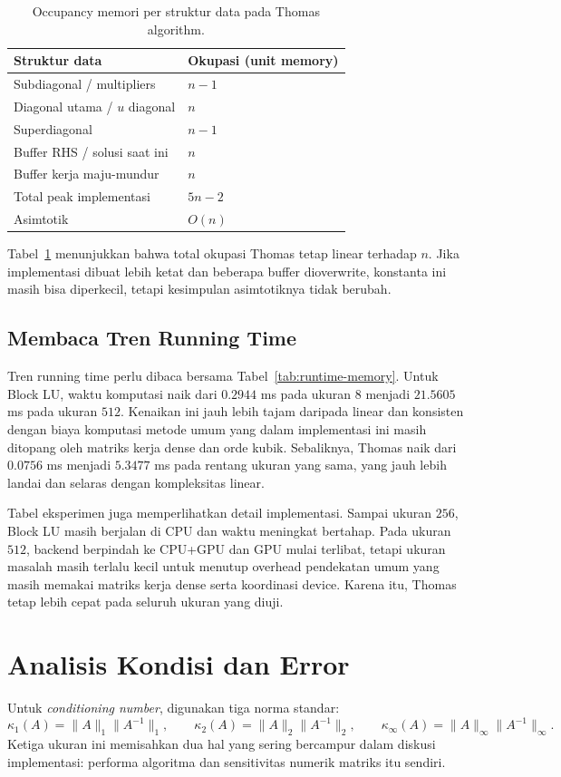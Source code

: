 \documentclass[12pt,a4paper]{article}
\begin{document}
\begin{table}[h]
\centering
\caption{Occupancy memori per struktur data pada Thomas algorithm.}
\label{tab:thomas-memory}
\begin{tabular}{ll}
\toprule
Struktur data & Okupasi (unit memory) \\
\midrule
Subdiagonal / multipliers & $n-1$ \\
Diagonal utama / $u$ diagonal & $n$ \\
Superdiagonal & $n-1$ \\
Buffer RHS / solusi saat ini & $n$ \\
Buffer kerja maju-mundur & $n$ \\
\midrule
Total peak implementasi & $5n - 2$ \\
Asimtotik & $O(n)$ \\
\bottomrule
\end{tabular}
\end{table}

Tabel~\ref{tab:thomas-memory} menunjukkan bahwa total okupasi Thomas tetap linear terhadap $n$. Jika implementasi dibuat lebih ketat dan beberapa buffer dioverwrite, konstanta ini masih bisa diperkecil, tetapi kesimpulan asimtotiknya tidak berubah.

\subsection{Membaca Tren Running Time}
Tren running time perlu dibaca bersama Tabel~\ref{tab:runtime-memory}. Untuk Block LU, waktu komputasi naik dari $0.2944$ ms pada ukuran $8$ menjadi $21.5605$ ms pada ukuran $512$. Kenaikan ini jauh lebih tajam daripada linear dan konsisten dengan biaya komputasi metode umum yang dalam implementasi ini masih ditopang oleh matriks kerja dense dan orde kubik. Sebaliknya, Thomas naik dari $0.0756$ ms menjadi $5.3477$ ms pada rentang ukuran yang sama, yang jauh lebih landai dan selaras dengan kompleksitas linear.

Tabel eksperimen juga memperlihatkan detail implementasi. Sampai ukuran $256$, Block LU masih berjalan di CPU dan waktu meningkat bertahap. Pada ukuran $512$, backend berpindah ke CPU+GPU dan GPU mulai terlibat, tetapi ukuran masalah masih terlalu kecil untuk menutup overhead pendekatan umum yang masih memakai matriks kerja dense serta koordinasi device. Karena itu, Thomas tetap lebih cepat pada seluruh ukuran yang diuji.

\section{Analisis Kondisi dan Error}
Untuk \emph{conditioning number}, digunakan tiga norma standar:
\[
\kappa_1(A)=\|A\|_1\|A^{-1}\|_1,\qquad
\kappa_2(A)=\|A\|_2\|A^{-1}\|_2,\qquad
\kappa_\infty(A)=\|A\|_\infty\|A^{-1}\|_\infty.
\]
Ketiga ukuran ini memisahkan dua hal yang sering bercampur dalam diskusi implementasi: performa algoritma dan sensitivitas numerik matriks itu sendiri.
\end{document}
